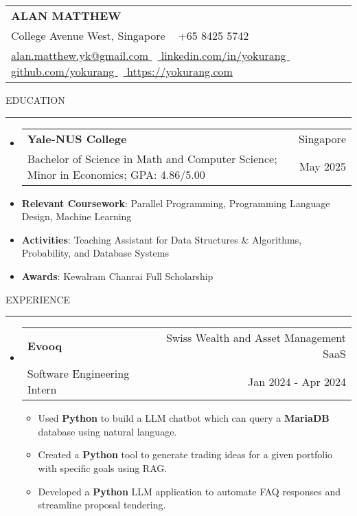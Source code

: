 \documentclass[letterpaper, 11pt]{article}
\makeatletter
\def\sectionlineskip{\medskip}
\def\sectionskip{\medskip}
\def\namesize{\LARGE}
\newcommand{\ResumeHeader}[6]{
  \noindent
  \begin{tabularx}{\textwidth}{>{\centering\arraybackslash}X}
    \namesize\MakeUppercase{\textbf{\fullname}} \\
    #1 \textbar\ #2 \\
    #3 \textbar\ #4 \textbar\ #5 \textbar\ #6 \\
  \end{tabularx}
}
\def \fullname { Alan Matthew }
\def \linkedinlink { https://www.linkedin.com/in/yokurang }
\def \linkedintext { linkedin.com/in/yokurang }
\def \phonenumber { +65 8425 5742 }
\def \githublink { https://github.com/yokurang }
\def \githubtext { github.com/yokurang }
\def \emaillink { mailto:alan.matthew.yk@gmail.com }
\def \emailtext { alan.matthew.yk@gmail.com }
\def \websitelink { https://yokurang-com.vercel.app/ }
\def \websitetext { https://yokurang.com }
\def \address { 28 College Avenue West, Singapore }
\def \headertype {\ResumeHeader}
\def \linkedin {\href{\linkedinlink}{\linkedintext}}
\def \phone {{\phonenumber}}
\def \email {\href{\emaillink}{\emailtext}}
\def \github {\href{\githublink}{\githubtext}}
\def \website {\href{\websitelink}{\websitetext}}
\newcommand{\SectionHeading}[1]{
  \sectionskip
  \raggedright\raggedbottom\MakeUppercase{\large{#1}}
  \sectionlineskip
  \hrule
  \color{black}
}
\newcommand{\ResumeEntryTSDL}[4]{
  \vspace{1pt}\item
    \begin{tabular*}{\textwidth}[t]{l@{\extracolsep{\fill}}r} 
      \textbf{#1} & #2 \\
      #3 & #4 \\
    \end{tabular*}\vspace{-2.835pt} %
}
\newcommand{\ResumeItem}[2]{
  \item{
    \textbf{#1}{: #2 \vspace{-2.835pt}}
  }
}
\newcommand{\ResumeItemDefault}[1]{
  \item{
    #1 \vspace{-2.835pt}
  }
}
\newcommand{\ResumeSubItem}[2]{\ResumeItem{#1}{#2}\vspace{-2.835pt}}
\newcommand{\ResumeEntryStart}{\begin{itemize}[leftmargin=0mm, label={}]}
\newcommand{\ResumeEntryEnd}{\end{itemize}\vspace{-2.835pt}} %
\newcommand{\ResumeItemListStart}{\begin{itemize}[leftmargin=5mm, label=$\bullet$, itemsep=1mm, parsep=1mm]} %
\newcommand{\ResumeItemListEnd}{\end{itemize}}
\makeatother
\begin{document}
  \headertype{\address}{\phone}{\email}{\linkedin}{\github}{\website}
  
  \SectionHeading{Education}
  \ResumeEntryStart
    \ResumeEntryTSDL{Yale-NUS College} {Singapore}
    {Bachelor of Science in Math and Computer Science; Minor in Economics; GPA: 4.86/5.00} {May 2025}
    \ResumeSubItem{Relevant Coursework}{Parallel Programming, Programming Language Design, Machine Learning}
    \ResumeSubItem{Activities}{Teaching Assistant for Data Structures \& Algorithms, Probability, and Database Systems}
    \ResumeSubItem{Awards}{Kewalram Chanrai Full Scholarship}
  \ResumeEntryEnd

  \vspace{5pt}

  \SectionHeading{Experience}
  \ResumeEntryStart
    \ResumeEntryTSDL{Evooq}{Swiss Wealth and Asset Management SaaS}{Software Engineering Intern}{Jan 2024 - Apr 2024}
    \ResumeItemListStart
    \ResumeItemDefault{Used \textbf{Python} to build a LLM chatbot which can query a \textbf{MariaDB} database using natural language.}
    \ResumeItemDefault{Created a \textbf{Python} tool to generate trading ideas for a given portfolio with specific goals using RAG.}
    \ResumeItemDefault{Developed a \textbf{Python} LLM application to automate FAQ responses and streamline proposal tendering.}
    \ResumeItemListEnd
  \ResumeEntryEnd
\end{document}
